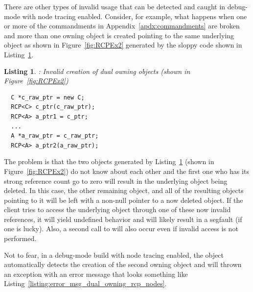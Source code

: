 \documentclass[pdf,ps2pdf,11pt]{SANDreport}
\newtheorem{listing}{Listing}
\begin{document}
There are other types of invalid usage that can be detected and caught
in debug-mode with node tracing enabled.  Consider, for example, what
happens when one or more of the commandments in
Appendix~\ref{apdx:commandments} are broken and more than one owning
{} object is created pointing to the same underlying
{} object as shown in Figure~\ref{fig:RCPEx2} generated
by the sloppy code shown in
Listing~\ref{listing:duplicate_owning_rcp}.


{}\begin{listing}: Invalid creation of dual owning {}
objects (shown in Figure~\ref{fig:RCPEx2})
\label{listing:duplicate_owning_rcp}
{\small\begin{verbatim}
  C *c_raw_ptr = new C;
  RCP<C> c_ptr(c_raw_ptr);
  RCP<A> a_ptr1 = c_ptr;
  ...
  A *a_raw_ptr = c_raw_ptr;
  RCP<A> a_ptr2(a_raw_ptr);
\end{verbatim}}
\end{listing}


The problem is that the two {} objects generated by
Listing~\ref{listing:duplicate_owning_rcp} (shown in
Figure~\ref{fig:RCPEx2}) do not know about each other and the first
one who has its strong reference count go to zero will result in the
underlying {} object being deleted.  In this case, the other
remaining {} object, and all of the resulting
{} objects pointing to it will be left with a non-null
pointer to a now deleted {} object.  If the client tries to
access the underlying object through one of these now invalid
references, it will yield undefined behavior and will likely result in
a segfault (if one is lucky).  Also, a second call to {}
will also occur even if invalid access is not performed.

Not to fear, in a debug-mode build with node tracing enabled, the
{} object automatically detects the creation of
the second owning {} object and will thrown an
exception with an error message that looks something like
Listing~\ref{listing:error_msg_dual_owning_rcp_nodes}.
\end{document}
